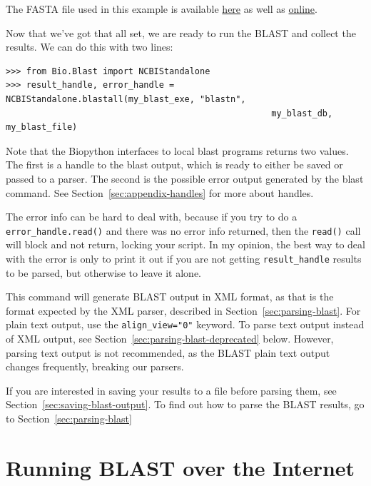 \documentclass{report}
\begin{document}
The FASTA file used in this example is available
\href{examples/m\_cold.fasta}{here} as well as
\href{http://biopython.org/DIST/docs/tutorial/examples/m\_cold.fasta}{online}.

Now that we've got that all set, we are ready to run the BLAST and collect the results. We can do this with two lines:

\begin{verbatim}
>>> from Bio.Blast import NCBIStandalone
>>> result_handle, error_handle = NCBIStandalone.blastall(my_blast_exe, "blastn",
                                                    my_blast_db, my_blast_file)
\end{verbatim}

Note that the Biopython interfaces to local blast programs returns two values. The first is a handle to the blast output, which is ready to either be saved or passed to a parser. The second is the possible error output generated by the blast command. See Section~\ref{sec:appendix-handles} for more about handles.

The error info can be hard to deal with, because if you try to do a \verb|error_handle.read()| and there was no error info returned, then the \verb|read()| call will block and not return, locking your script. In my opinion, the best way to deal with the error is only to print it out if you are not getting \verb|result_handle| results to be parsed, but otherwise to leave it alone.

This command will generate BLAST output in XML format, as that is the format expected by the XML parser, described in Section~\ref{sec:parsing-blast}. For plain text output, use the \verb|align_view="0"| keyword. To parse text output instead of XML output, see Section~\ref{sec:parsing-blast-deprecated} below. However, parsing text output is not recommended, as the BLAST plain text output changes frequently, breaking our parsers.

If you are interested in saving your results to a file before parsing them,
see Section~\ref{sec:saving-blast-output}. To find out how to parse the BLAST
results, go to Section~\ref{sec:parsing-blast}

\section{Running BLAST over the Internet}
\label{sec:running-www-blast}
\end{document}
